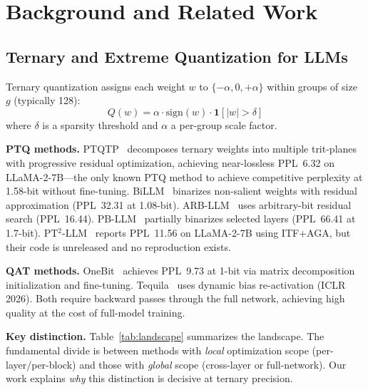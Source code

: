\documentclass[10pt,a4paper]{article}
\begin{document}
\section{Background and Related Work}
\label{sec:related}

\subsection{Ternary and Extreme Quantization for LLMs}

Ternary quantization assigns each weight $w$ to $\{-\alpha, 0, +\alpha\}$ within groups of size $g$ (typically 128):
\begin{equation}
    Q(w) = \alpha \cdot \text{sign}(w) \cdot \mathbf{1}[|w| > \delta]
\end{equation}
where $\delta$ is a sparsity threshold and $\alpha$ a per-group scale factor.

\textbf{PTQ methods.}
PTQTP~\citep{ptqtp2025} decomposes ternary weights into multiple trit-planes with progressive residual optimization, achieving near-lossless PPL~6.32 on LLaMA-2-7B---the only known PTQ method to achieve competitive perplexity at 1.58-bit without fine-tuning.
BiLLM~\citep{billm2024} binarizes non-salient weights with residual approximation (PPL~32.31 at 1.08-bit).
ARB-LLM~\citep{arbllm2024} uses arbitrary-bit residual search (PPL~16.44).
PB-LLM~\citep{pbllm2024} partially binarizes selected layers (PPL~66.41 at 1.7-bit).
PT$^2$-LLM~\citep{pt2llm2025} reports PPL~11.56 on LLaMA-2-7B using ITF+AGA, but their code is unreleased and no reproduction exists.

\textbf{QAT methods.}
OneBit~\citep{onebit2024} achieves PPL~9.73 at 1-bit via matrix decomposition initialization and fine-tuning.
Tequila~\citep{tequila2025} uses dynamic bias re-activation (ICLR 2026).
Both require backward passes through the full network, achieving high quality at the cost of full-model training.

\textbf{Key distinction.}
Table~\ref{tab:landscape} summarizes the landscape. The fundamental divide is between methods with \textit{local} optimization scope (per-layer/per-block) and those with \textit{global} scope (cross-layer or full-network). Our work explains \textit{why} this distinction is decisive at ternary precision.
\end{document}
